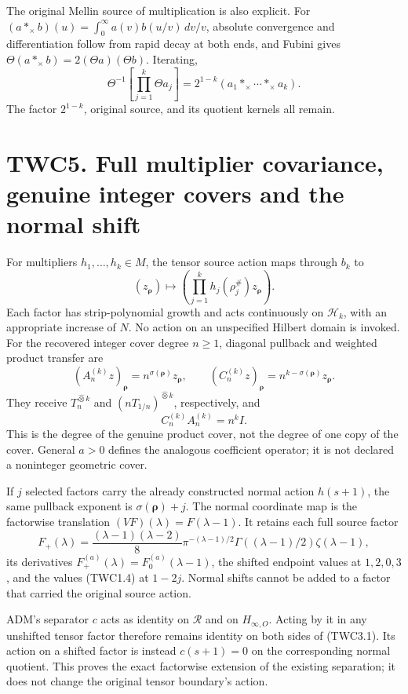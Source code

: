 The original Mellin source of multiplication is also explicit. For
\((a*_\times b)(u)=\int_0^\infty a(v)b(u/v)\,dv/v\), absolute
convergence and differentiation follow from rapid decay at both ends,
and Fubini gives \(\Theta(a*_\times b)=2(\Theta a)(\Theta b)\).
Iterating, \[
\Theta^{-1}\left[\prod_{j=1}^k\Theta a_j\right]
=2^{1-k}(a_1*_\times\cdots*_\times a_k).
\tag{TWC4.7}
\] The factor \(2^{1-k}\), original source, and its quotient kernels all
remain.

\section{TWC5. Full multiplier covariance, genuine integer covers and
the normal
shift}\label{twc5.-full-multiplier-covariance-genuine-integer-covers-and-the-normal-shift}

For multipliers \(h_1,\ldots,h_k\in M\), the tensor source action maps
through \(b_k\) to \[
(z_{\boldsymbol\rho})\longmapsto
\left(\prod_{j=1}^kh_j(\rho_j^\#)z_{\boldsymbol\rho}\right).
\tag{TWC5.1}
\] Each factor has strip-polynomial growth and acts continuously on
\(\mathscr H_k\), with an appropriate increase of \(N\). No action on an
unspecified Hilbert domain is invoked. For the recovered integer cover
degree \(n\ge1\), diagonal pullback and weighted product transfer are \[
(A_n^{(k)}z)_{\boldsymbol\rho}=n^{\sigma(\boldsymbol\rho)}z_{\boldsymbol\rho},
\qquad
(C_n^{(k)}z)_{\boldsymbol\rho}=n^{k-\sigma(\boldsymbol\rho)}z_{\boldsymbol\rho}.
\tag{TWC5.2}
\] They receive \(T_n^{\widehat\otimes k}\) and
\((nT_{1/n})^{\widehat\otimes k}\), respectively, and \[
C_n^{(k)}A_n^{(k)}=n^k I.
\tag{TWC5.3}
\] This is the degree of the genuine product cover, not the degree of
one copy of the cover. General \(a>0\) defines the analogous coefficient
operator; it is not declared a noninteger geometric cover.

If \(j\) selected factors carry the already constructed normal action
\(h(s+1)\), the same pullback exponent is \(\sigma(\boldsymbol\rho)+j\).
The normal coordinate map is the factorwise translation
\((VF)(\lambda)=F(\lambda-1)\). It retains each full source factor \[
F_+(\lambda)=\frac{(\lambda-1)(\lambda-2)}8\pi^{-(\lambda-1)/2}
\Gamma((\lambda-1)/2)\zeta(\lambda-1),
\tag{TWC5.4}
\] its derivatives \(F_+^{(a)}(\lambda)=F_0^{(a)}(\lambda-1)\), the
shifted endpoint values at \(1,2,0,3\), and the values (TWC1.4) at
\(1-2j\). Normal shifts cannot be added to a factor that carried the
original source action.

ADM's separator \(c\) acts as identity on \(\mathcal R\) and on
\(H_{\infty,O}\). Acting by it in any unshifted tensor factor therefore
remains identity on both sides of (TWC3.1). Its action on a shifted
factor is instead \(c(s+1)=0\) on the corresponding normal quotient.
This proves the exact factorwise extension of the existing separation;
it does not change the original tensor boundary's action.

